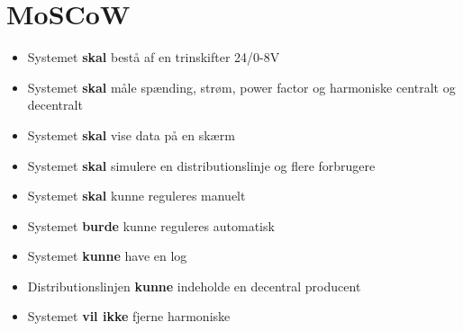 
\section{MoSCoW}

\begin{itemize}
\item{Systemet \textbf{skal} bestå af en trinskifter 24/0-8V}
\item{Systemet \textbf{skal} måle spænding, strøm, power factor og harmoniske centralt og decentralt}
\item{Systemet \textbf{skal} vise data på en skærm}
\item{Systemet \textbf{skal} simulere en distributionslinje og flere forbrugere}
\item{Systemet \textbf{skal} kunne reguleres manuelt}
\item{Systemet \textbf{burde} kunne reguleres automatisk}
\item{Systemet \textbf{kunne} have en log}
\item{Distributionslinjen \textbf{kunne} indeholde en decentral producent}
\item{Systemet \textbf{vil ikke} fjerne harmoniske} 
\end{itemize}

